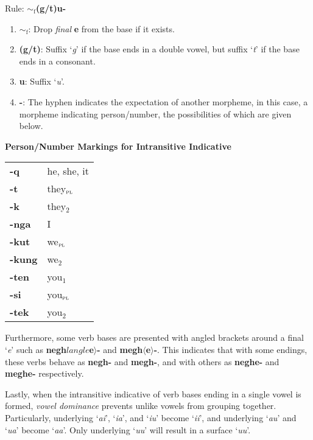 \documentclass{article}
\begin{document}
\noindent Rule: \textbf{${\sim}_\text{f}$(g/t)u-}

\begin{enumerate}
\item \textbf{${\sim}_\text{f}$}: Drop \textit{final} \textbf{e} from the base if it exists.
\item \textbf{(g/t)}: Suffix `\textit{g}' if the base ends in a double vowel, but suffix `\textit{t}' if the base ends in a consonant.
\item \textbf{u}: Suffix `\textit{u}'.
\item \textbf{-}: The hyphen indicates the expectation of another morpheme, in this case, a morpheme indicating person/number, the possibilities of which are given below.
\end{enumerate}

\textbf{Person/Number Markings for Intransitive Indicative}

\begin{tabular}{ l l }
\textbf{-q} & he, she, it \\ 
\textbf{-t} & they$_\text{\textsc{pl}}$ \\  
\textbf{-k} & they$_\text{2}$ \\
\textbf{-nga} & I \\
\textbf{-kut} & we$_\text{\textsc{pl}}$ \\  
\textbf{-kung} & we$_\text{2}$ \\  
\textbf{-ten} & you$_\text{1}$ \\
\textbf{-si} & you$_\text{\textsc{pl}}$ \\
\textbf{-tek} & you$_\text{2}$
\end{tabular}

\vspace{12pt}

Furthermore, some verb bases are presented with angled brackets around a final `\textit{e}' such as \textbf{negh$langle$e$\rangle$-} and \textbf{megh$\langle$e$\rangle$-}.
%
This indicates that with some endings, these verbs behave as \textbf{negh-} and \textbf{megh-}, and with others as \textbf{neghe-} and \textbf{meghe-} respectively.

Lastly, when the intransitive indicative of verb bases ending in a single vowel is formed, \textit{vowel dominance} prevents unlike vowels from grouping together.
%
Particularly, underlying `\textit{ai}', `\textit{ia}', and `\textit{iu}' become `\textit{ii}', and underlying `\textit{au}' and `\textit{ua}' become `\textit{aa}'.
%
Only underlying `\textit{uu}' will result in a surface `\textit{uu}'.
\end{document}
